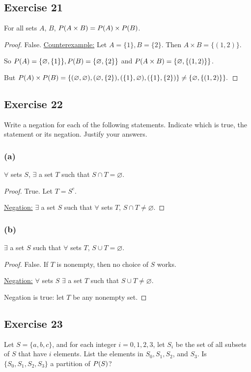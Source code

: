 \documentclass[14pt]{extarticle}
\let\mathscr\relax
\newcommand{\ps}{\mathscr{P}}
\newcommand{\es}{\varnothing}
\begin{document}
\subsection{Exercise 21}
For all sets $A$, $B$, \(\ps(A \times B) = \ps(A) \times \ps(B)\).

\begin{proof}
False. \underline{Counterexample:} Let \(A = \{1\}, B = \{2\}\). Then \(A \times B = \{(1, 2)\}\). 

So \(\ps(A) = 
\{\es, \{1\}\}, \ps(B) = \{\es, \{2\}\}\) and \(\ps(A \times B) = \{\es, \{(1, 2)\}\}\). 

But \(\ps(A) \times \ps(B) = \{(\es, \es), (\es, \{2\}), (\{1\}, \es), (\{1\}, \{2\})\} \neq \{\es, \{(1, 2)\}\}.\)
\end{proof}

\subsection{Exercise 22}
Write a negation for each of the following statements. Indicate which is true, the statement or its negation. 
Justify your answers.

\subsubsection{(a)}
\(\forall\) sets $S$, \(\exists\) a set $T$ such that \(S \cap T = \es\).

\begin{proof}
True. Let $T = S^c$.

\underline{Negation:} \(\exists\) a set $S$ such that \( \forall\) sets $T$, \(S \cap T \neq \es\).
\end{proof}

\subsubsection{(b)}
\(\exists\) a set $S$ such that \(\forall\) sets $T$, \(S \cup T = \es\).

\begin{proof}
False. If $T$ is nonempty, then no choice of $S$ works.

\underline{Negation:} \(\forall\) sets $S$ \(\exists\) a set $T$ such that \(S \cup T \neq \es\).

Negation is true: let $T$ be any nonempty set.
\end{proof}

\subsection{Exercise 23}
Let \(S = \{a, b, c\}\), and for each integer \(i = 0, 1, 2, 3\), let $S_i$ be the set of all subsets of $S$ that 
have $i$ elements. List the elements in \(S_0, S_1, S_2\), and $S_3$. Is \(\{S_0, S_1, S_2, S_3\}\) a partition of $\ps(S)$?
\end{document}

